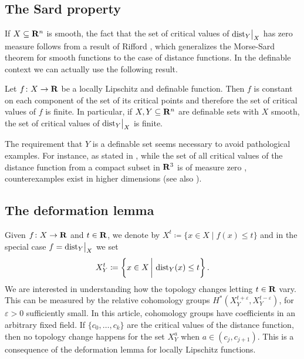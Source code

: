 \subsection{The Sard property}
\label{D!sec:sard}

If $X \subseteq \mathbf{R}^n$ is smooth, the fact that the set of critical values of $\mathord{\operatorname{dist}}_Y\big|_X$ has zero measure  follows from a result of Rifford \cite{Rifford2004}, which generalizes the Morse-Sard theorem for smooth functions to the case of distance functions. In the definable context we can actually use the following result.

\begin{proposition}
\label{D!propo:crit_values_definable}
  Let $f \colon X\to \mathbf{R}$ be a locally Lipschitz and definable function. Then $f$ is constant on each component of the set of its critical points and therefore the set of critical values of $f$ is finite. In particular, if $X, Y \subseteq \mathbf{R}^n$ are definable sets with $X$ smooth, the set of critical values of $\mathord{\operatorname{dist}}_Y\big|_X$ is finite.
\end{proposition}

\begin{remark}
\label{D!remark:needed}
  The requirement that $Y$ is a definable set seems necessary to avoid pathological examples. For instance, as stated in \cite[Remark 1.1]{Rifford2004}, while the set of all critical values of the distance function from a compact subset in $\mathbf{R}^3$ is of measure zero \cite{Fu1985}, counterexamples exist in higher dimensions \cite[Example 3]{Ferry1976} (see also \cite{Whitney1935}).
\end{remark}

\subsection{The deformation lemma}

Given $f \colon X \to \mathbf{R}$ and $t \in \mathbf{R}$, we denote by $X^t \coloneq \{x\in X \mid f(x) \leq t\}$ and in the special case $f = \mathord{\operatorname{dist}}_Y\big|_X$ we set 
\[
  X_Y^{t} \coloneq \left\{x \in X \,\bigg|\, \operatorname{dist}_Y(x) \leq t\right\}.
\]
We are interested in understanding how the topology changes letting $t \in \mathbf{R}$ vary. This can be measured by the relative cohomology groups $H^*(X_Y^{t + \varepsilon}, X_Y^{t - \varepsilon})$, for $\varepsilon > 0$ sufficiently small. In this article, cohomology groups have coefficients in an arbitrary fixed field.
If  $\{c_0, \ldots, c_k\}$ are the critical values of the distance function, then no topology change happens for the set $X_Y^a$ when $a \in (c_j, c_{j+1})$. This is a consequence of the deformation lemma for locally Lipschitz functions.

